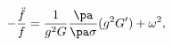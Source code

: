 \begin{equation}
- \frac{\ddot{f}}{f} = \frac{1}{g^2G} \frac{\pa}{\pa\sigma}(g^2G') 
+ \omega^2,
\label{ff}\end{equation}

